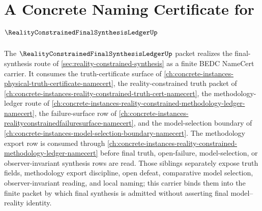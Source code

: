 \chapter{A Concrete Naming Certificate for $\RealityConstrainedFinalSynthesisLedgerUp$}
\label{ch:concrete-instances-reality-constrained-final-synthesis-ledger-namecert}

The $\RealityConstrainedFinalSynthesisLedgerUp$ packet realizes the final-synthesis route of \autoref{sec:reality-constrained-synthesis} as a finite BEDC NameCert carrier. It consumes the truth-certificate surface of \autoref{ch:concrete-instances-physical-truth-certificate-namecert}, the reality-constrained truth packet of \autoref{ch:concrete-instances-reality-constrained-truth-cert-namecert}, the methodology-ledger route of \autoref{ch:concrete-instances-reality-constrained-methodology-ledger-namecert}, the failure-surface row of \autoref{ch:concrete-instances-realityconstrainedfailuresurface-namecert}, and the model-selection boundary of \autoref{ch:concrete-instances-model-selection-boundary-namecert}. The methodology export row is consumed through \autoref{ch:concrete-instances-reality-constrained-methodology-ledger-namecert} before final truth, open-failure, model-selection, or observer-invariant synthesis rows are read. Those siblings separately expose truth fields, methodology export discipline, open defeat, comparative model selection, observer-invariant reading, and local naming; this carrier binds them into the finite packet by which final synthesis is admitted without asserting final model--reality identity.

